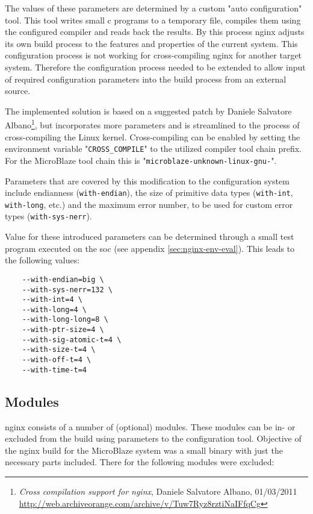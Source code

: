The values of these parameters are determined by a custom "auto configuration" tool. This tool writes small c programs to a temporary file, compiles them using the configured compiler and reads back the results. By this process nginx adjusts its own build process to the features and properties of the current system. This configuration process is not working for cross-compiling nginx for another target system. Therefore the configuration process needed to be extended to allow input of required configuration parameters into the build process from an external source.

The implemented solution is based on a suggested patch by Daniele Salvatore Albano\footnote{\textit{Cross compilation support for nginx}, Daniele Salvatore Albano, 01/03/2011 \url{http://web.archiveorange.com/archive/v/Tuw7Ryz8rztiNaIFfqCg}}, but incorporates more parameters and is streamlined to the process of cross-compiling the Linux kernel. Cross-compiling can be enabled by setting the environment variable "\texttt{CROSS\_COMPILE}" to the utilized compiler tool chain prefix. For the MicroBlaze tool chain this is "\texttt{microblaze-unknown-linux-gnu-}".

Parameters that are covered by this modification to the configuration system include endianness (\texttt{with-endian}), the size of primitive data types (\texttt{with-int}, \texttt{with-long}, etc.) and the maximum error number, to be used for custom error types (\texttt{with-sys-nerr}).

Value for these introduced parameters can be determined through a small test program executed on the \gls{soc} (see appendix \ref{sec:nginx-env-eval}). This leads to the following values:

\begin{verbatim}
    --with-endian=big \
    --with-sys-nerr=132 \
    --with-int=4 \
    --with-long=4 \
    --with-long-long=8 \
    --with-ptr-size=4 \
    --with-sig-atomic-t=4 \
    --with-size-t=4 \
    --with-off-t=4 \
    --with-time-t=4
\end{verbatim}

\subsection{Modules}

nginx consists of a number of (optional) modules. These modules can be in- or excluded from the build using parameters to the configuration tool. Objective of the nginx build for the MicroBlaze system was a small binary with just the necessary parts included. There for the following modules were excluded:


